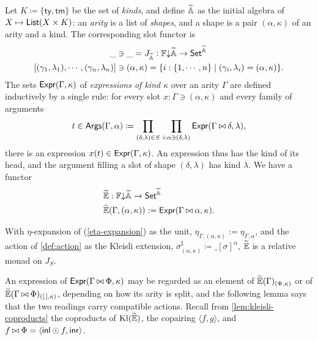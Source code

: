 \begin{definition}\label{def:kinds}
    Let $K \coloneqq \{\mathsf{ty}, \mathsf{tm}\}$ be the set of \emph{kinds}, and define $\widetilde{\mathbb{A}}$ as the initial algebra of $X \mapsto \mathsf{List}(X \times K)$: an \emph{arity} is a list of \emph{shapes}, and a shape is a pair $(\alpha, \kappa)$ of an arity and a kind. The corresponding slot functor is
    \begin{align*}
        \_ &\ni\_ = J_{\widetilde{\mathbb{A}}} : \mathbb{F}{\downarrow}\widetilde{\mathbb{A}} \to \mathsf{Set}^{\widetilde{\mathbb{A}}}\\
        [(\gamma_1,\lambda_1),\cdots,(\gamma_n,\lambda_n)] &\ni(\alpha,\kappa) = \{i : \{1,\cdots,n\} \mid (\gamma_i,\lambda_i) = (\alpha,\kappa)\}.
    \end{align*}
    The sets $\mathsf{Expr}(\Gamma, \kappa)$ of \emph{expressions of kind $\kappa$} over an arity $\Gamma$ are defined inductively by a single rule: for every slot $x : \Gamma \ni (\alpha, \kappa)$ and every family of arguments
    \[
        t \in \mathsf{Args}(\Gamma, \alpha) \coloneqq \prod_{(\delta, \lambda) \in S}\, \prod_{i : \alpha \ni (\delta, \lambda)} \mathsf{Expr}(\Gamma \mathbin{\bowtie} \delta, \lambda),
    \]
    there is an expression $x(t) \in \mathsf{Expr}(\Gamma, \kappa)$. An expression thus has the kind of its head, and the argument filling a slot of shape $(\delta, \lambda)$ has kind $\lambda$. We have a functor
    \begin{align*}
        &\widetilde{\mathbb{E}} :  \mathbb{F}{\downarrow}\widetilde{\mathbb{A}} \to \mathsf{Set}^{\widetilde{\mathbb{A}}}\\
        &\widetilde{\mathbb{E}}(\Gamma,(\alpha,\kappa)) := \mathsf{Expr}(\Gamma \mathbin{\bowtie} \alpha, \kappa).
    \end{align*}
\end{definition}

\begin{proposition}\label{prop:kinded-monad}
    With $\eta$-expansion of (\cref{eta-expansion}) as the unit, $\eta_{\Gamma,(\alpha,\kappa)} := \eta_{\Gamma,\alpha}$, and the action of \cref{def:action} as the Kleisli extension, $\sigma^\sharp_{(\alpha, \kappa)} \coloneqq \_[\sigma]^\alpha$, $\widetilde{\mathbb{E}}$ is a relative monad on $J_S$.
\end{proposition}

An expression of $\mathsf{Expr}(\Gamma \mathbin{\bowtie} \Phi, \kappa)$ may be regarded as an element of $\widetilde{\mathbb{E}}(\Gamma)_{(\Phi, \kappa)}$ or of $\widetilde{\mathbb{E}}(\Gamma \mathbin{\bowtie} \Phi)_{(\left[\,\right], \kappa)}$, depending on how its arity is split, and the following lemma says that the two readings carry compatible actions. Recall from \cref{lem:kleisli-coproducts} the coproducts of $\mathrm{Kl}(\widetilde{\mathbb{E}})$, the copairing $\langle f, g \rangle$, and $f \mathbin{\bowtie} \Phi = \langle \mathsf{inl} \odot f, \mathsf{inr} \rangle$.

